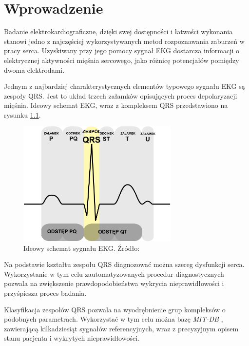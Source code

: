 \chapter{Wprowadzenie}
\large{
Badanie elektrokardiograficzne, dzięki swej dostępności i łatwości wykonania stanowi jedno z najczęściej wykorzystywanych metod rozpoznawania zaburzeń w pracy serca. Uzyskiwany przy jego pomocy sygnał EKG dostarcza informacji o elektrycznej aktywności mięśnia sercowego, jako różnicę potencjałów pomiędzy dwoma elektrodami.

Jednym z najbardziej charakterystycznych elementów typowego sygnału EKG są zespoły QRS. Jest to układ trzech załamków opisujących proces depolaryzacji mięśnia. Ideowy schemat EKG, wraz z kompleksem QRS przedstawiono na rysunku \ref{fig:qrs-complex}.


\begin{figure}[H]
	\centering
	\includegraphics[width=8cm]{img/qrs-complex}
	\caption{Ideowy schemat sygnału EKG. Źródło: \cite{qrs-wiki}}
	\label{fig:qrs-complex}
\end{figure}

Na podstawie kształtu zespołu QRS diagnozować można szereg dysfunkcji serca. Wykorzystanie w tym celu zautomatyzowanych procedur diagnostycznych pozwala na zwiększenie prawdopodobieństwa wykrycia nieprawidłowości i przyśpiesza proces badania.

Klasyfikacja zespołów QRS pozwala na wyodrębnienie grup kompleksów o podobnych parametrach. Wykorzystać w tym celu można bazę \textit{MIT-DB} \cite{mitdb}, zawierającą kilkadziesiąt sygnałów referencyjnych, wraz z precyzyjnym opisem stanu pacjenta i wykrytych nieprawidłowości.
}
